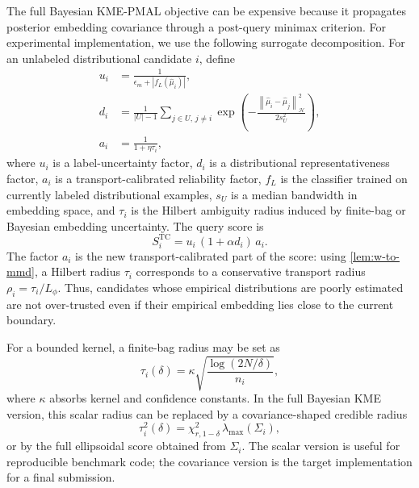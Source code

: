 \documentclass[10pt,journal]{IEEEtran}
\newcommand{\Hcal}{\mathcal{H}}
\newcommand{\wh}{\widehat}
\newcommand{\norm}[1]{\left\lVert #1 \right\rVert}
\begin{document}
The full Bayesian KME-PMAL objective can be expensive because it propagates posterior embedding covariance through a post-query minimax criterion. For experimental implementation, we use the following surrogate decomposition. For an unlabeled distributional candidate $i$, define
\begin{align}
    u_i &= \frac{1}{\epsilon_m+|f_L(\wh\mu_i)|}, \\
    d_i &= \frac{1}{|U|-1}\sum_{j\in U,\,j\ne i}\exp\left(-\frac{\norm{\wh\mu_i-\wh\mu_j}_{\Hcal}^2}{2s_U^2}\right), \\
    a_i &= \frac{1}{1+\eta\tau_i},
\end{align}
where $u_i$ is a label-uncertainty factor, $d_i$ is a distributional representativeness factor, $a_i$ is a transport-calibrated reliability factor, $f_L$ is the classifier trained on currently labeled distributional examples, $s_U$ is a median bandwidth in embedding space, and $\tau_i$ is the Hilbert ambiguity radius induced by finite-bag or Bayesian embedding uncertainty. The query score is
\begin{equation}
\label{eq:tc-score}
    S_i^{\mathrm{TC}} = u_i\,(1+\alpha d_i)\,a_i.
\end{equation}
The factor $a_i$ is the new transport-calibrated part of the score: using \cref{lem:w-to-mmd}, a Hilbert radius $\tau_i$ corresponds to a conservative transport radius $\rho_i=\tau_i/L_\phi$. Thus, candidates whose empirical distributions are poorly estimated are not over-trusted even if their empirical embedding lies close to the current boundary.

For a bounded kernel, a finite-bag radius may be set as
\begin{equation}
\label{eq:simple-radius}
    \tau_i(\delta)=\kappa\sqrt{\frac{\log(2N/\delta)}{n_i}},
\end{equation}
where $\kappa$ absorbs kernel and confidence constants. In the full Bayesian KME version, this scalar radius can be replaced by a covariance-shaped credible radius
\begin{equation}
\label{eq:bayes-radius-alg}
    \tau_i^2(\delta)=\chi^2_{r,1-\delta}\,\lambda_{\max}(\Sigma_i),
\end{equation}
or by the full ellipsoidal score obtained from $\Sigma_i$. The scalar version is useful for reproducible benchmark code; the covariance version is the target implementation for a final submission.
\end{document}
